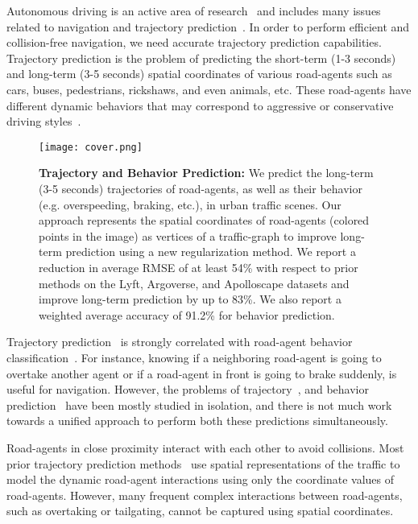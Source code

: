 \documentclass[10pt,twocolumn,letterpaper]{article}
\theoremstyle{plain}
\begin{document}
Autonomous driving is an active area of research~\cite{ad1,ad2} and includes many issues related to navigation and trajectory prediction~\cite{ad2}. In order to perform efficient and collision-free navigation, we need accurate trajectory prediction capabilities.
Trajectory prediction is the problem of predicting the short-term (1-3 seconds) and long-term (3-5 seconds) spatial coordinates of various road-agents such as cars, buses, pedestrians, rickshaws, and even animals, etc. These road-agents have different dynamic behaviors that may correspond to aggressive or conservative driving styles~\cite{humanfactor1,humanfactor2,humanfactor3}. 
\begin{figure}[t]
    \centering
    \texttt{[image: cover.png]}
    \caption{\textbf{Trajectory and Behavior Prediction:} We predict the long-term (3-5 seconds) trajectories of road-agents, as well as their behavior (e.g. overspeeding, braking, etc.), in urban traffic scenes. Our approach represents the spatial coordinates of road-agents (colored points in the image) as vertices of a traffic-graph to improve long-term prediction using a new regularization method. We report a reduction in average RMSE of at least 54\% with respect to prior methods on the Lyft, Argoverse, and Apolloscape datasets and improve long-term prediction by up to 83\%. We also report a weighted average accuracy of 91.2\% for behavior prediction. }
    \vspace{-15pt}
    \label{fig:cover}
\end{figure}


Trajectory prediction~\cite{traphic,nachiket,chandra2019robusttp} is strongly correlated with road-agent behavior classification~\cite{chandra2019graphrqi,ernest,sarkar2019behavior}. For instance, knowing if a neighboring road-agent is going to overtake another agent or if a road-agent in front is going to brake suddenly, is useful for navigation. However, the problems of trajectory~\cite{traphic,nachiket,chandra2019robusttp}, and behavior prediction~\cite{chandra2019graphrqi,ernest} have been mostly studied in isolation, and there is not much work towards a unified approach to perform both these predictions simultaneously. 

Road-agents in close proximity interact with each other to avoid collisions. Most prior trajectory prediction methods~\cite{traphic,nachiket,chandra2019robusttp} use spatial representations of the traffic to model the dynamic road-agent interactions using only the coordinate values of road-agents. 
However, many frequent complex interactions between road-agents, such as overtaking or tailgating, cannot be captured using spatial coordinates. 
\end{document}
